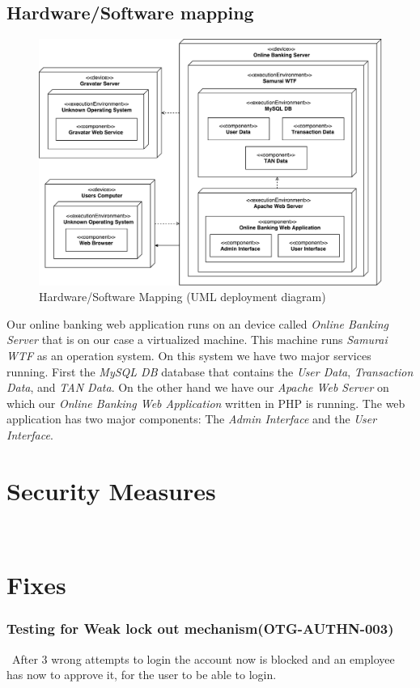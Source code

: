 \documentclass[headsepline,footsepline,footinclude=false,oneside,fontsize=11pt,paper=a4,listof=totoc,bibliography=totoc]{scrbook} %
\begin{document}
\pagebreak
\section{Hardware/Software mapping}

\begin{figure}[!ht]
	\centering
	\includegraphics[scale=0.55]{figures/hw_sw_mapping.pdf}
	\caption{Hardware/Software Mapping (UML deployment diagram)}
	\label{fig1}
\end{figure}

Our online banking web application runs on an device called \textit{Online Banking Server} that is on our case a virtualized machine. This machine runs \textit{Samurai WTF} as an operation system. On this system we have two major services running. First the \textit{MySQL DB} database that contains the \textit{User Data}, \textit{Transaction Data}, and \textit{TAN Data}. On the other hand we have our \textit{Apache Web Server} on which our \textit{Online Banking Web Application} written in PHP is running. The web application has two major components: The \textit{Admin Interface} and the \textit{User Interface}.

\chapter{Security Measures} \

\chapter{Fixes}

\subsection{Testing for Weak lock out mechanism(OTG-AUTHN-003)}\
After 3 wrong attempts to login the account now is blocked and an employee has now to approve it, for the user to be able to login. \
\end{document}
